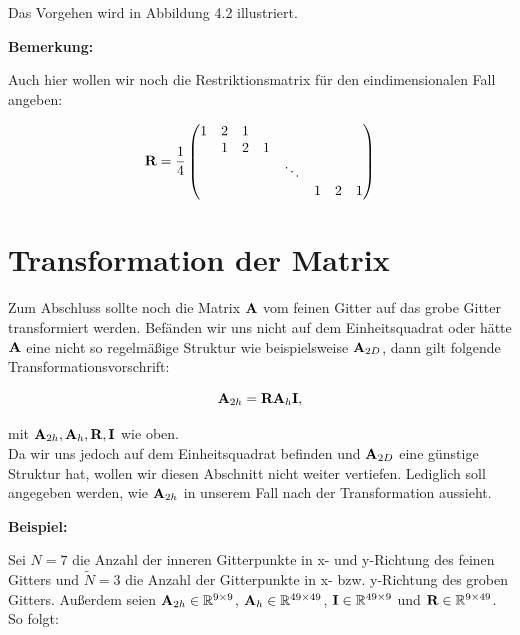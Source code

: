 Das Vorgehen wird in Abbildung 4.2 illustriert.

 \label{img.restriction}

\textbf{Bemerkung:}

Auch hier wollen wir noch die Restriktionsmatrix für den eindimensionalen Fall angeben:

\begin{equation}
{\textbf{R}} = \frac {1} {4}
\begin{pmatrix}
1 & 2 & 1\\
  & 1 & 2 & 1\\
  &   &   &   & \ddots\\
  &   &   &   &        & 1 & 2 & 1
\end{pmatrix}
\end{equation}

\section{Transformation der Matrix}

Zum Abschluss sollte noch die Matrix ${\textbf{A}}$ vom feinen Gitter auf das grobe Gitter transformiert werden. Befänden wir uns nicht auf dem Einheitsquadrat oder hätte ${\textbf{A}}$ eine nicht so regelmäßige Struktur wie beispielsweise ${\textbf{A}}_{2D}$, dann gilt folgende Transformationsvorschrift:

\begin{equation}
{\textbf{A}}_{2h} = {\textbf{R}}{\textbf{A}}_{h}{\textbf{I}},
\end{equation}

mit ${\textbf{A}}_{2h},{\textbf{A}}_{h},{\textbf{R}},{\textbf{I}}$ wie oben.\\
Da wir uns jedoch auf dem Einheitsquadrat befinden und ${\textbf{A}}_{2D}$ eine günstige Struktur hat, wollen wir diesen Abschnitt nicht weiter vertiefen. Lediglich soll angegeben werden, wie ${\textbf{A}}_{2h}$ in unserem Fall nach der Transformation aussieht.

\textbf{Beispiel:}

Sei $N = 7$ die Anzahl der inneren Gitterpunkte in x- und y-Richtung des feinen Gitters und $\tilde N = 3$ die Anzahl der Gitterpunkte in x- bzw. y-Richtung des groben Gitters. Außerdem seien ${\textbf{A}}_{2h} \in \mathbb{R}^{9 \times 9}$, ${\textbf{A}}_{h} \in \mathbb{R}^{49 \times 49}$, ${\textbf{I}} \in \mathbb{R}^{49 \times 9}$ und ${\textbf{R}} \in \mathbb{R}^{9 \times 49}$. So folgt:

